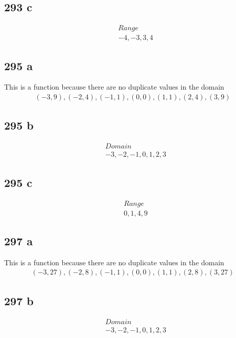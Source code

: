 \documentclass{article}
\begin{document}
    \subsection*{293 c}
    \begin{align*}
        &Range\\
        &{-4, -3, 3, 4}
    \end{align*}

    \subsection*{295 a}
    This is a function because there are no duplicate values in the domain
    \begin{align*}
        (-3, 9), (-2, 4), (-1, 1), (0, 0), (1, 1), (2, 4), (3, 9)
    \end{align*}

    \subsection*{295 b}
    \begin{align*}
        &Domain\\
        &-3, -2, -1, 0, 1, 2, 3
    \end{align*}

    \subsection*{295 c}
    \begin{align*}
        &Range\\
        &0, 1, 4, 9
    \end{align*}

    \subsection*{297 a}
    This is a function because there are no duplicate values in the domain
    \begin{align*}
        (-3, 27), (-2, 8), (-1, 1), (0, 0), (1, 1), (2, 8), (3, 27)
    \end{align*}

    \subsection*{297 b}
    \begin{align*}
        &Domain\\
        &-3, -2, -1, 0, 1, 2, 3
    \end{align*}
\end{document}
